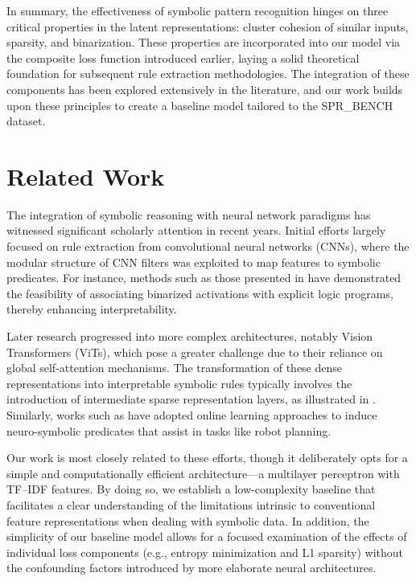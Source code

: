 \documentclass{article}
\begin{document}
In summary, the effectiveness of symbolic pattern recognition hinges on three critical properties in the latent representations: cluster cohesion of similar inputs, sparsity, and binarization. These properties are incorporated into our model via the composite loss function introduced earlier, laying a solid theoretical foundation for subsequent rule extraction methodologies. The integration of these components has been explored extensively in the literature, and our work builds upon these principles to create a baseline model tailored to the SPR\_BENCH dataset.

\section{Related Work}
The integration of symbolic reasoning with neural network paradigms has witnessed significant scholarly attention in recent years. Initial efforts largely focused on rule extraction from convolutional neural networks (CNNs), where the modular structure of CNN filters was exploited to map features to symbolic predicates. For instance, methods such as those presented in \cite{arxiv2505} have demonstrated the feasibility of associating binarized activations with explicit logic programs, thereby enhancing interpretability.

Later research progressed into more complex architectures, notably Vision Transformers (ViTs), which pose a greater challenge due to their reliance on global self-attention mechanisms. The transformation of these dense representations into interpretable symbolic rules typically involves the introduction of intermediate sparse representation layers, as illustrated in \cite{arxiv2505}. Similarly, works such as \cite{arxiv2410} have adopted online learning approaches to induce neuro-symbolic predicates that assist in tasks like robot planning.

Our work is most closely related to these efforts, though it deliberately opts for a simple and computationally efficient architecture—a multilayer perceptron with TF–IDF features. By doing so, we establish a low-complexity baseline that facilitates a clear understanding of the limitations intrinsic to conventional feature representations when dealing with symbolic data. In addition, the simplicity of our baseline model allows for a focused examination of the effects of individual loss components (e.g., entropy minimization and L1 sparsity) without the confounding factors introduced by more elaborate neural architectures.
\end{document}
